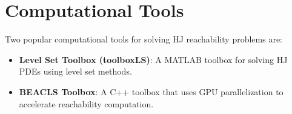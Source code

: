\documentclass{article}
\begin{document}
\section{Computational Tools}
Two popular computational tools for solving HJ reachability problems are:
\begin{itemize}
    \item \textbf{Level Set Toolbox (toolboxLS)}: A MATLAB toolbox for solving HJ PDEs using level set methods.
    \item \textbf{BEACLS Toolbox}: A C++ toolbox that uses GPU parallelization to accelerate reachability computation.
\end{itemize}
\end{document}
